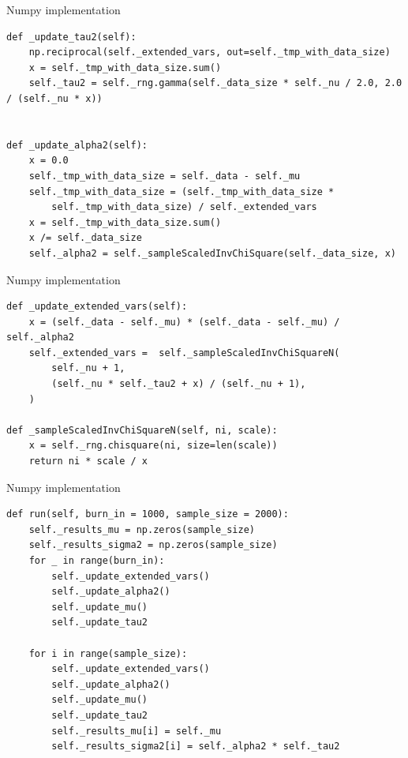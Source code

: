 \documentclass[8pt]{beamer}
\begin{document}
\begin{frame}[fragile]{Numpy implementation}
\begin{verbatim}
def _update_tau2(self):
	np.reciprocal(self._extended_vars, out=self._tmp_with_data_size)
	x = self._tmp_with_data_size.sum()
	self._tau2 = self._rng.gamma(self._data_size * self._nu / 2.0, 2.0 / (self._nu * x))


def _update_alpha2(self):
	x = 0.0
	self._tmp_with_data_size = self._data - self._mu
	self._tmp_with_data_size = (self._tmp_with_data_size * 
		self._tmp_with_data_size) / self._extended_vars
	x = self._tmp_with_data_size.sum()
	x /= self._data_size
	self._alpha2 = self._sampleScaledInvChiSquare(self._data_size, x)
\end{verbatim}
\end{frame}

\begin{frame}[fragile]{Numpy implementation}
\begin{verbatim}
def _update_extended_vars(self):
	x = (self._data - self._mu) * (self._data - self._mu) / self._alpha2
	self._extended_vars =  self._sampleScaledInvChiSquareN(
		self._nu + 1, 
		(self._nu * self._tau2 + x) / (self._nu + 1),
	)

def _sampleScaledInvChiSquareN(self, ni, scale):
	x = self._rng.chisquare(ni, size=len(scale))
	return ni * scale / x
\end{verbatim}
\end{frame}

\begin{frame}[fragile]{Numpy implementation}
\begin{verbatim}
def run(self, burn_in = 1000, sample_size = 2000):
	self._results_mu = np.zeros(sample_size)
	self._results_sigma2 = np.zeros(sample_size)
	for _ in range(burn_in):
		self._update_extended_vars()
		self._update_alpha2()
		self._update_mu()
		self._update_tau2

	for i in range(sample_size):
		self._update_extended_vars()
		self._update_alpha2()
		self._update_mu()
		self._update_tau2
		self._results_mu[i] = self._mu
		self._results_sigma2[i] = self._alpha2 * self._tau2
\end{verbatim}
\end{frame}
\end{document}
